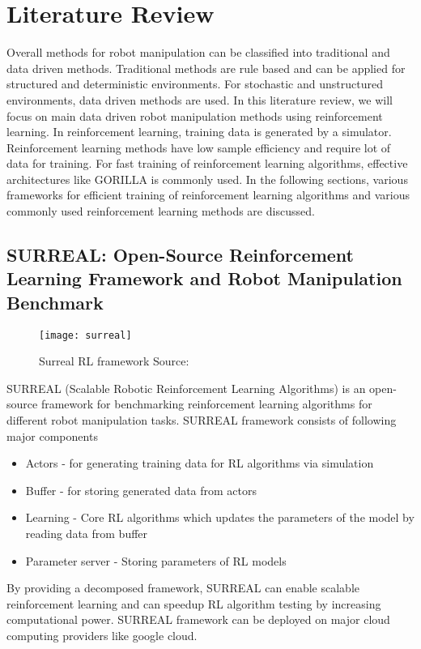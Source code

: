 \chapter{Literature Review}

Overall methods for robot manipulation can be classified into traditional and data driven methods. Traditional methods are rule based and can be applied for structured and deterministic environments. For stochastic and unstructured environments, data driven methods are used. In this literature review, we will focus on main data driven robot manipulation methods using reinforcement learning. In reinforcement learning, training data is generated by a simulator. Reinforcement learning methods have low sample efficiency and require lot of data for training. For fast training of reinforcement learning algorithms, effective architectures like GORILLA \cite{gorila} is commonly used. In the following sections, various frameworks for efficient training of reinforcement learning algorithms and various commonly used reinforcement learning methods are discussed.

\section{SURREAL: Open-Source Reinforcement Learning Framework and Robot Manipulation Benchmark}
\begin{figure}[H]
	\centering
	\texttt{[image: surreal]}
	\caption{Surreal RL framework Source: \cite{corl2018surreal}}
\end{figure}

SURREAL (Scalable Robotic Reinforcement Learning Algorithms) is an open-source framework for benchmarking reinforcement learning algorithms for different robot manipulation tasks. SURREAL framework consists of following major components

\begin{itemize}
	\item Actors - for generating training data for RL algorithms via simulation
	\item Buffer - for storing generated data from actors
	\item Learning - Core RL algorithms which updates the parameters of the model by reading data from buffer
	\item Parameter server - Storing parameters of RL models
\end{itemize}

By providing a decomposed framework, SURREAL can enable scalable reinforcement learning and can speedup RL algorithm testing by increasing computational power. SURREAL framework can be deployed on major cloud computing providers like google cloud.

